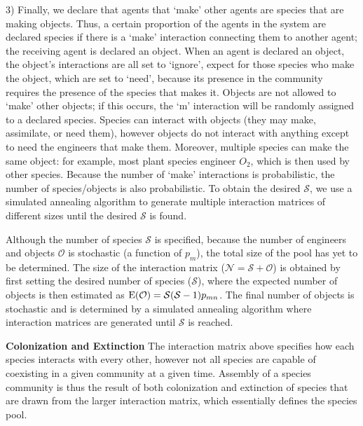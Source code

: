 \documentclass[twocolumn,preprintnumbers,amsmath,amssymb,superscriptaddress]{revtex4}
\begin{document}
3) Finally, we declare that agents that `make' other agents are species that are making objects.
Thus, a certain proportion of the agents in the system are declared species if there is a `make' interaction connecting them to another agent; the receiving agent is declared an object.
When an agent is declared an object, the object's interactions are all set to `ignore', expect for those species who make the object, which are set to `need', because its presence in the community requires the presence of the species that makes it.
Objects are not allowed to `make' other objects; if this occurs, the `m' interaction will be randomly assigned to a declared species.
Species can interact with objects (they may make, assimilate, or need them), however objects do not interact with anything except to need the engineers that make them.
Moreover, multiple species can make the same object: for example, most plant species engineer $O_2$, which is then used by other species.
Because the number of `make' interactions is probabilistic, the number of species/objects is also probabilistic.
To obtain the desired $\mathcal{S}$, we use a simulated annealing algorithm to generate multiple interaction matrices of different sizes until the desired $\mathcal{S}$ is found.


Although the number of species $\mathcal{S}$ is specified, because the number of engineers and objects $\mathcal{O}$ is stochastic (a function of $p_m$), the total size of the pool has yet to be determined.
The size of the interaction matrix ($\mathcal{N} = \mathcal{S} + \mathcal{O}$) is obtained by first setting the desired number of species ($\mathcal{S}$), where the expected number of objects is then estimated as ${\rm E}(\mathcal{O}) = \mathcal{S}(\mathcal{S}-1)p_{mn}$.
The final number of objects is stochastic and is determined by a simulated annealing algorithm where interaction matrices are generated until $\mathcal{S}$ is reached.



\textbf{Colonization and Extinction} The interaction matrix above specifies how each species interacts with every other, however not all species are capable of coexisting in a given community at a given time.
Assembly of a species community is thus the result of both colonization and extinction of species that are drawn from the larger interaction matrix, which essentially defines the species pool.
\end{document}
